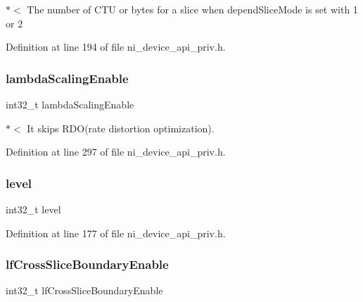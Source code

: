$\ast$$<$ The number of C\+TU or bytes for a slice when depend\+Slice\+Mode is set with 1 or 2 

Definition at line 194 of file ni\+\_\+device\+\_\+api\+\_\+priv.\+h.

\mbox{\label{struct__ni__t408__config__t_a06f108e2fef1adb2027b28792be9740b}} 
\subsubsection{\texorpdfstring{lambdaScalingEnable}{lambdaScalingEnable}}
{\footnotesize\ttfamily int32\+\_\+t lambda\+Scaling\+Enable}

$\ast$$<$ It skips R\+D\+O(rate distortion optimization). 

Definition at line 297 of file ni\+\_\+device\+\_\+api\+\_\+priv.\+h.

\mbox{\label{struct__ni__t408__config__t_a89eb5b8aeacf564f248d836e4ea62f8e}} 
\subsubsection{\texorpdfstring{level}{level}}
{\footnotesize\ttfamily int32\+\_\+t level}



Definition at line 177 of file ni\+\_\+device\+\_\+api\+\_\+priv.\+h.

\mbox{\label{struct__ni__t408__config__t_a5855f5f4dc4bfe206ecde7aec5359450}} 
\subsubsection{\texorpdfstring{lfCrossSliceBoundaryEnable}{lfCrossSliceBoundaryEnable}}
{\footnotesize\ttfamily int32\+\_\+t lf\+Cross\+Slice\+Boundary\+Enable}


